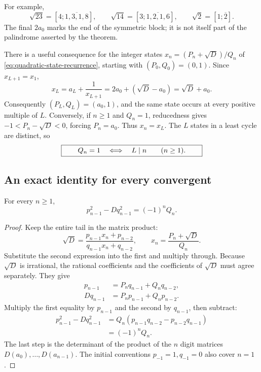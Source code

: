 For example,
\[
 \sqrt{23}=[4;\overline{1,3,1,8}],\qquad
 \sqrt{14}=[3;\overline{1,2,1,6}],\qquad
 \sqrt2=[1;\overline2].
\]
The final $2a_0$ marks the end of the symmetric block; it is not itself
part of the palindrome asserted by the theorem.

There is a useful consequence for the integer states
$x_n=(P_n+\sqrt D)/Q_n$ of
\eqref{eq:quadratic-state-recurrence}, starting with $(P_0,Q_0)=(0,1)$.
Since $x_{L+1}=x_1$,
\[
 x_L=a_L+\frac1{x_{L+1}}=2a_0+(\sqrt D-a_0)=\sqrt D+a_0.
\]
Consequently $(P_L,Q_L)=(a_0,1)$, and the same state occurs at every
positive multiple of $L$. Conversely, if $n\ge1$ and $Q_n=1$, reducedness
gives $-1<P_n-\sqrt D<0$, forcing $P_n=a_0$. Thus $x_n=x_L$.
The $L$ states in a least cycle are distinct, so
\begin{equation}\label{eq:pell-state-return}
 \boxed{\qquad Q_n=1\quad\Longleftrightarrow\quad L\mid n
 \qquad(n\ge1).\qquad}
\end{equation}

\subsection*{An exact identity for every convergent}
\begin{lemma}
\label{lem:pell-remainder}
For every $n\ge1$,
\begin{equation}\label{eq:pell-remainder}
 \boxed{\quad p_{n-1}^2-Dq_{n-1}^2=(-1)^nQ_n.\quad}
\end{equation}
\end{lemma}
\begin{proof}
Keep the entire tail in the matrix product:
\[
 \sqrt D
 =\frac{p_{n-1}x_n+p_{n-2}}{q_{n-1}x_n+q_{n-2}},
 \qquad x_n=\frac{P_n+\sqrt D}{Q_n}.
\]
Substitute the second expression into the first and multiply through.
Because $\sqrt D$ is irrational, the rational coefficients and the
coefficients of $\sqrt D$ must agree separately. They give
\begin{align*}
 p_{n-1}&=P_nq_{n-1}+Q_nq_{n-2},\\
 Dq_{n-1}&=P_np_{n-1}+Q_np_{n-2}.
\end{align*}
Multiply the first equality by $p_{n-1}$ and the second by $q_{n-1}$,
then subtract:
\begin{align*}
 p_{n-1}^2-Dq_{n-1}^2
 &=Q_n(p_{n-1}q_{n-2}-p_{n-2}q_{n-1})\\
 &=(-1)^nQ_n.
\end{align*}
The last step is the determinant of the product of the $n$ digit
matrices $D(a_0),\ldots,D(a_{n-1})$. The initial conventions
$p_{-1}=1,q_{-1}=0$ also cover $n=1$.
\end{proof}

